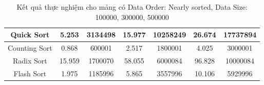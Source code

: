 \begin{table}[H]
{\begin{tabular}{|ccccccc|}
\multicolumn{1}{|c|}{Quick Sort} & \multicolumn{1}{c|}{5.253} & \multicolumn{1}{c|}{3134498} & \multicolumn{1}{c|}{15.977} & \multicolumn{1}{c|}{10258249} & \multicolumn{1}{c|}{26.674} & \multicolumn{1}{c|}{17737894} \\ \hline
\multicolumn{1}{|c|}{Counting Sort} & \multicolumn{1}{c|}{0.868} & \multicolumn{1}{c|}{600001} & \multicolumn{1}{c|}{2.517} & \multicolumn{1}{c|}{1800001} & \multicolumn{1}{c|}{4.025} & \multicolumn{1}{c|}{3000001} \\ \hline
\multicolumn{1}{|c|}{Radix Sort} & \multicolumn{1}{c|}{15.959} & \multicolumn{1}{c|}{1700070} & \multicolumn{1}{c|}{58.055} & \multicolumn{1}{c|}{6000084} & \multicolumn{1}{c|}{96.828} & \multicolumn{1}{c|}{10000084} \\ \hline
\multicolumn{1}{|c|}{Flash Sort} & \multicolumn{1}{c|}{1.975} & \multicolumn{1}{c|}{1185996} & \multicolumn{1}{c|}{5.865} & \multicolumn{1}{c|}{3557996} & \multicolumn{1}{c|}{10.106} & \multicolumn{1}{c|}{5929996} \\ \hline
\end{tabular}%
}
\caption{Kết quả thực nghiệm cho mảng có Data Order: Nearly sorted, Data Size: 100000, 300000, 500000}
\label{tab:nearly_sorted_100000_300000_500000}
\end{table}

